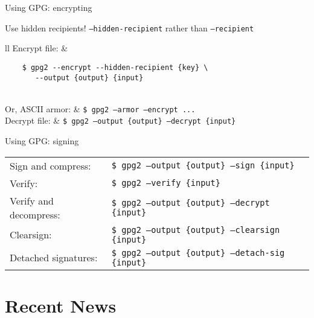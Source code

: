 \documentclass{beamer}
\begin{document}
\begin{frame}[fragile]{Using GPG: encrypting}
	\setlength{\parskip}{1.5em}

	Use hidden recipients! \texttt{--hidden-recipient} rather than
	\texttt{--recipient}

	\small
	\def\arraystretch{3}

	\begin{tabular}{ll}
	Encrypt file: & \begin{minipage}{0em}
	\begin{verbatim}
	$ gpg2 --encrypt --hidden-recipient {key} \
       --output {output} {input}
       \end{verbatim}
       \end{minipage} \\

	Or, ASCII armor: & \texttt{\$ gpg2 --armor --encrypt ...}\\

	Decrypt file: & \texttt{\$ gpg2 --output \{output\} --decrypt \{input\}}
	\end{tabular}
\end{frame}

\begin{frame}{Using GPG: signing}
	\small
	\def\arraystretch{3}

	\begin{tabular}{ll}
	Sign and compress: & \texttt{\$ gpg2 --output \{output\} --sign
	\{input\}} \\

	Verify: & \texttt{\$ gpg2 --verify \{input\}} \\

	Verify and decompress: & \texttt{\$ gpg2 --output \{output\} --decrypt
	\{input\}} \\

	Clearsign: & \texttt{\$ gpg2 --output \{output\} --clearsign \{input\}}
	\\

	Detached signatures: & \texttt{\$ gpg2 --output \{output\} --detach-sig
	\{input\}} \\ \end{tabular}
\end{frame}

\section{Recent News}
\end{document}
